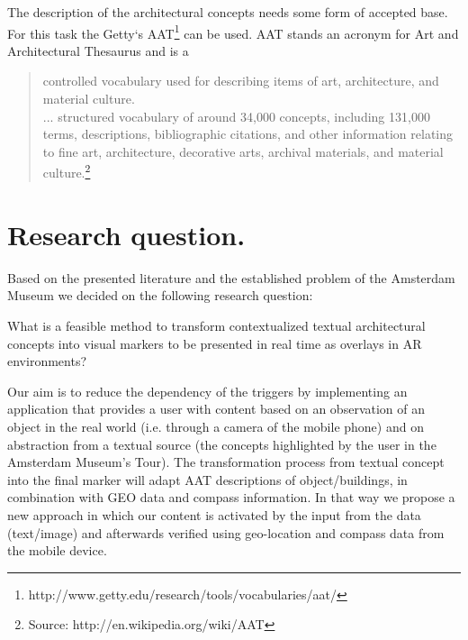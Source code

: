 \documentclass[12pt ]{article}
\begin{document}
The description of the architectural concepts needs some form of accepted base. For this task the Getty`s AAT\footnote{http://www.getty.edu/research/tools/vocabularies/aat/} can be used. 
AAT stands an acronym for Art and Architectural Thesaurus and is a
\begin{quotation}
controlled vocabulary used for describing items of art, architecture, and material culture. \\
... structured vocabulary of around 34,000 concepts, including 131,000 terms, descriptions, bibliographic citations, and other information relating to fine art, architecture, decorative arts, archival materials, and material 
culture.\footnote{Source: http://en.wikipedia.org/wiki/AAT}
\end{quotation}

\section{Research question.}\label{research question.}
Based on the presented literature and the established problem of the Amsterdam Museum we decided on the following research question:

What is a feasible method to transform contextualized textual architectural concepts into visual markers to be presented in real time as overlays in AR environments?

Our aim is to reduce the dependency of the triggers by implementing an application that provides a user with content based on an observation of an object in the real world (i.e. through a camera of the mobile phone) and on abstraction from a textual source (the concepts highlighted by the user in the Amsterdam Museum’s Tour). The transformation process from textual concept into the final marker will adapt AAT  descriptions of object/buildings, in combination with GEO data and compass information. In that way we  propose a new approach in which our content is activated by the input from the data (text/image) and afterwards verified using geo-location and compass data from the mobile device.  
\end{document}
